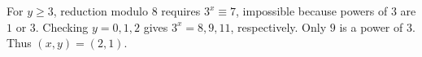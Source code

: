 For $y\ge3$, reduction modulo $8$ requires $3^x\equiv7$, impossible because powers of $3$ are $1$ or $3$. Checking $y=0,1,2$ gives $3^x=8,9,11$, respectively. Only $9$ is a power of $3$. Thus $\boxed{(x,y)=(2,1)}$.
